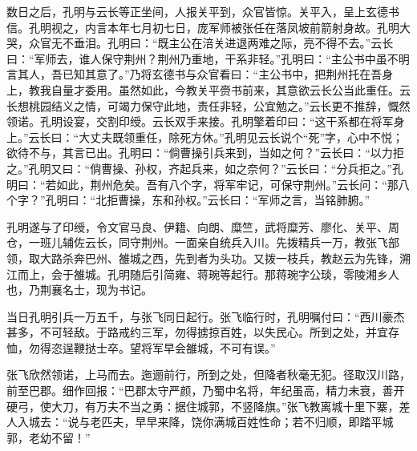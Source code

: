 数日之后，孔明与云长等正坐间，人报关平到，众官皆惊。关平入，呈上玄德书信。孔明视之，内言本年七月初七日，庞军师被张任在落凤坡前箭射身故。孔明大哭，众官无不垂泪。孔明曰：“既主公在涪关进退两难之际，亮不得不去。”云长曰：“军师去，谁人保守荆州？荆州乃重地，干系非轻。”孔明曰：“主公书中虽不明言其人，吾已知其意了。”乃将玄德书与众官看曰：“主公书中，把荆州托在吾身上，教我自量才委用。虽然如此，今教关平赍书前来，其意欲云长公当此重任。云长想桃园结义之情，可竭力保守此地，责任非轻，公宜勉之。”云长更不推辞，慨然领诺。孔明设宴，交割印绶。云长双手来接。孔明擎着印曰：“这干系都在将军身上。”云长曰：“大丈夫既领重任，除死方休。”孔明见云长说个“死”字，心中不悦；欲待不与，其言已出。孔明曰：“倘曹操引兵来到，当如之何？”云长曰：“以力拒之。”孔明又曰：“倘曹操、孙权，齐起兵来，如之奈何？”云长曰：“分兵拒之。”孔明曰：“若如此，荆州危矣。吾有八个字，将军牢记，可保守荆州。”云长问：“那八个字？”孔明曰：“北拒曹操，东和孙权。”云长曰：“军师之言，当铭肺腑。”

孔明遂与了印绶，令文官马良、伊籍、向朗、糜竺，武将糜芳、廖化、关平、周仓，一班儿辅佐云长，同守荆州。一面亲自统兵入川。先拨精兵一万，教张飞部领，取大路杀奔巴州、雒城之西，先到者为头功。又拨一枝兵，教赵云为先锋，溯江而上，会于雒城。孔明随后引简雍、蒋琬等起行。那蒋琬字公琰，零陵湘乡人也，乃荆襄名士，现为书记。

当日孔明引兵一万五千，与张飞同日起行。张飞临行时，孔明嘱付曰：“西川豪杰甚多，不可轻敌。于路戒约三军，勿得掳掠百姓，以失民心。所到之处，并宜存恤，勿得恣逞鞭挞士卒。望将军早会雒城，不可有误。”

张飞欣然领诺，上马而去。迤逦前行，所到之处，但降者秋毫无犯。径取汉川路，前至巴郡。细作回报：“巴郡太守严颜，乃蜀中名将，年纪虽高，精力未衰，善开硬弓，使大刀，有万夫不当之勇：据住城郭，不竖降旗。”张飞教离城十里下寨，差人入城去：“说与老匹夫，早早来降，饶你满城百姓性命；若不归顺，即踏平城郭，老幼不留！”


